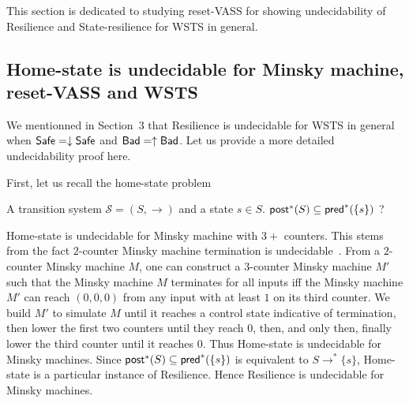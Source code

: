 This section is dedicated to studying reset-VASS for showing undecidability of {\sc Resilience} and {\sc State-resilience} for WSTS in general. 

\subsection{Home-state is undecidable for Minsky machine, reset-VASS and WSTS}\label{HS-Minsk}


We mentionned in Section~$3$ that {\sc Resilience} is undecidable for WSTS in general when $\textsf{Safe} = \downarrow \textsf{Safe}$ and $\textsf{Bad} = \uparrow \textsf{Bad}$. Let us provide a more detailed undecidability proof here.

First, let us recall the home-state problem

{A transition system $\mathscr{S}=(S,\rightarrow)$ and a state $s \in S$.}
{$\textsf{post}^*(S) \subseteq \textsf{pred}^*(\{s\})$ ?\newline}



Home-state is undecidable for Minsky machine with $3+$ counters.
This stems from the fact $2$-counter Minsky machine termination is undecidable~\cite{Min61, Min67}.
From a $2$-counter Minsky machine $M$, one can construct a $3$-counter Minsky machine $M'$ 
such that the Minsky machine $M$ terminates for all inputs iff the Minsky machine $M'$ can reach $(0,0,0)$ from any input with at least $1$ on its third counter. We build $M'$ to simulate $M$ until it reaches a control state indicative of termination, then lower the first two counters until they reach $0$, then, and only then, finally lower the third counter until it reaches $0$.
Thus {\sc Home-state} is undecidable for Minsky machines. Since $\textsf{post}^*(S) \subseteq \textsf{pred}^*(\{s\})$ is equivalent to $S \rightarrow^* \{s\}$,  {\sc Home-state} is a particular instance of {\sc Resilience}. Hence {\sc Resilience} is undecidable for Minsky machines.


